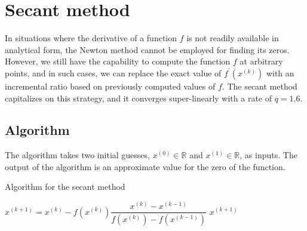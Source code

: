 \section{Secant method}

In situations where the derivative of a function $f$ is not readily available in analytical form, the Newton method cannot be employed for finding its zeros. 
However, we still have the capability to compute the function $f$ at arbitrary points, and in such cases, we can replace the exact value of $f^{'}(x^{(k)})$ with an incremental ratio based on previously computed values of $f$. 
The secant method capitalizes on this strategy, and it converges super-linearly with a rate of $q=1.6$. 

\subsection*{Algorithm}
The algorithm takes two initial guesses, $x^{(0)} \in \mathbb{R}$ and $x^{(1)} \in \mathbb{R}$, as inputs. 
The output of the algorithm is an approximate value for the zero of the function.
\begin{algorithm}[H]
    \caption{Algorithm for the secant method}
        \begin{algorithmic}[1]
                \State $x^{(k+1)}=x^{(k)}-f(x^{(k)})\dfrac{x^{(k)}-x^{(k-1)}}{f(x^{(k)})-f(x^{(k-1)})}$
                    \State \Return $x^{(k+1)}$
                \EndIf
            \EndFor
        \end{algorithmic}
\end{algorithm}